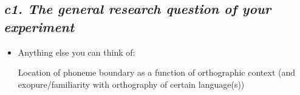 \documentclass[12pt, english]{article}
\begin{document}

\subsection*{\emph{c1. The general research question of your experiment}}
\vspace{10pt}

\begin{itemize}
    \item Anything else you can think of: \par
    Location of phoneme boundary as a function of orthographic context (and exopure/familiarity with orthography of certain language(s))
\end{itemize}

\end{document}
